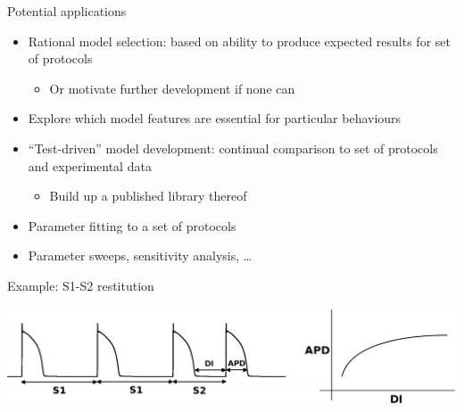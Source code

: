 \documentclass[t,xcolor={usenames,dvipsnames}]{beamer}
\newcommand{\subitem}[1]{\begin{itemize}\item #1 \end{itemize}}
\begin{document}
\begin{frame}{Potential applications}
\begin{itemize}
\item Rational model selection: based on ability to produce expected results for set of protocols
  \subitem{Or motivate further development if none can}
\item Explore which model features are essential for particular behaviours
\item ``Test-driven'' model development: continual comparison to set of protocols and experimental data
  \subitem{Build up a published library thereof}
\item Parameter fitting to a set of protocols
\item Parameter sweeps, sensitivity analysis, \ldots
\end{itemize}
\end{frame}

\begin{frame}{Example: S1-S2 restitution}
\begin{center}
\includegraphics[width=\textwidth]{S1S2}
\end{center}
\end{frame}
\end{document}
